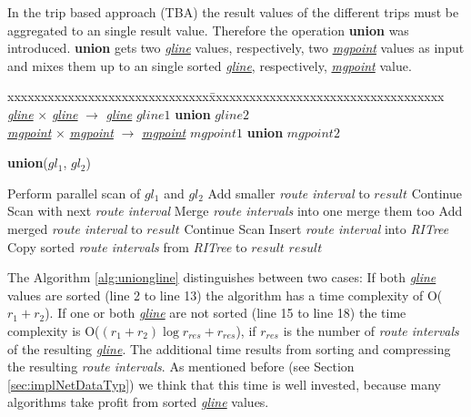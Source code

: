 \documentclass[a4paper]{article}
\newcommand{\op}[1]{\textbf{#1}}
\newcommand{\dt}[1]{\textsl{\underline{#1}}}
\begin{document}
In the trip based approach (TBA) the result values of the different trips must
be
aggregated to an single result value. Therefore the operation \op{union} was
introduced. \op{union} gets two \dt{gline} values, respectively, two
\dt{mgpoint} values as
input and mixes them up to an single sorted \dt{gline}, respectively,
\dt{mgpoint} value.
\begin{tabbing}
xxxxxxxxxxxxxxxxxxxxxxxxxxxxxx\=xxxxxxxxxxxxxxxxxxxxxxxxxxxxxxxxxxx\kill
\dt{gline} $\times$ \dt{gline} $\rightarrow$ \dt{gline} \> $gline1$ \op{union}
$gline2$ \\
\dt{mgpoint} $\times$ \dt{mgpoint} $\rightarrow$ \dt{mgpoint} \> $mgpoint1$
\op{union} $mgpoint2$\\
\end{tabbing}
\begin{algorithm}[H]
  \caption{\op{union}($gl_1$, $gl_2$)}
  \label{alg:uniongline}
  \begin{algorithmic}[1]
      \STATE Perform parallel scan of $gl_1$ and $gl_2$
         \STATE Add smaller \textit{route interval} to $result$
         \STATE Continue Scan with next \textit{route interval}
      \ELSE
          \STATE Merge \textit{route intervals} into one
            \STATE merge them too
          \ENDIF
          \STATE Add merged \textit{route interval} to $result$
          \STATE Continue Scan
      \ENDIF
    \ELSE
        \STATE Insert \textit{route interval} into \textit{RITree}
      \ENDFOR
      \STATE Copy sorted \textit{route intervals} from \textit{RITree} to $result$
    \ENDIF
    \RETURN $result$
  \end{algorithmic}
\end{algorithm}
The Algorithm \ref{alg:uniongline} distinguishes between two cases:
If both \dt{gline} values are sorted (line 2 to line 13) the algorithm has a
time complexity of O($r_1 + r_2$). If one or both \dt{gline} are not sorted
(line 15 to line 18) the time complexity is O($(r_1 + r_2) \log r_{res} +
r_{res}$), if $r_{res}$ is the number of \textit{route intervals} of the
resulting \dt{gline}. The additional
time results from sorting and compressing the resulting \textit{route
intervals}. As mentioned before (see Section \ref{sec:implNetDataTyp}) we think
that this time is well invested, because many algorithms take profit from
sorted \dt{gline} values.
\end{document}
